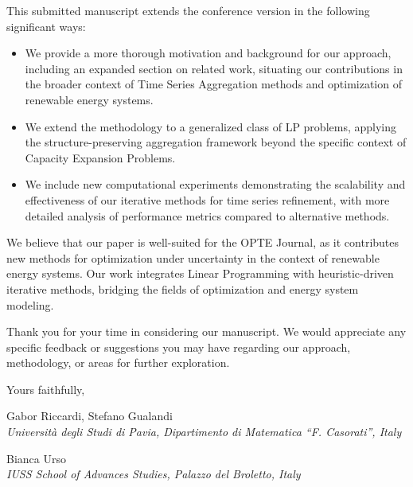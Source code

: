 \documentclass{letter}
\begin{document}
\begin{letter}{}
 This submitted manuscript extends the conference version in the following significant ways:

 \begin{itemize} 

\item We provide a more thorough motivation and background for our approach, including an expanded section on related work, situating our contributions in the broader context of Time Series Aggregation methods and optimization of renewable energy systems.

 \item We extend the methodology to a generalized class of LP problems, applying the structure-preserving aggregation framework beyond the specific context of Capacity Expansion Problems. 

\item We include new computational experiments demonstrating the scalability and effectiveness of our iterative methods for time series refinement, with more detailed analysis of performance metrics compared to alternative methods. 

\end{itemize}

We believe that our paper is well-suited for the OPTE Journal,  as it contributes new methods for optimization under uncertainty in the context of renewable energy systems. Our work integrates Linear Programming with heuristic-driven iterative methods, bridging the fields of optimization and energy system modeling.

Thank you for your time in considering our manuscript. We would appreciate any specific feedback or suggestions you may have regarding our approach, methodology, or areas for further exploration.
\bigskip

Yours faithfully,

\begin{flushright}
Gabor Riccardi, Stefano Gualandi\\\textit{Università degli Studi di Pavia, Dipartimento di Matematica ``F. Casorati'', Italy}

Bianca Urso \\\textit{IUSS School of Advances Studies, Palazzo del Broletto,  Italy\\}
\end{flushright}

\thispagestyle{empty}
\end{letter}
\end{document}
